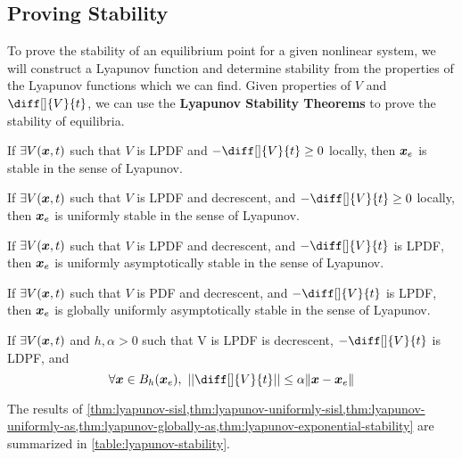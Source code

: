 \subsection{Proving Stability}
To prove the stability of an equilibrium point for a given nonlinear system, we
will construct a Lyapunov function and determine stability from the properties
of the Lyapunov functions which we can find. Given properties of $V$ and $\diff[]{V}{t}$, we can use the \textbf{Lyapunov
Stability Theorems} to prove the stability of equilibria.
\begin{theorem}
	If $\exists V(\boldsymbol{x}, t)$ such that $V$ is LPDF and
	$-\diff[]{V}{t} \geq 0$ locally, then $\boldsymbol{x}_e$ is stable in the sense of
	Lyapunov.
	\label{thm:lyapunov-sisl}
\end{theorem}
\begin{theorem}
	If $\exists V(\boldsymbol{x}, t)$ such that $V$ is LPDF and decrescent, and 
	$-\diff[]{V}{t} \geq 0$ locally, then $\boldsymbol{x}_e$ is uniformly stable in the sense of
	Lyapunov.
	\label{thm:lyapunov-uniformly-sisl}
\end{theorem}
\begin{theorem}
	If $\exists V(\boldsymbol{x}, t)$ such that $V$ is LPDF and decrescent, and 
	$-\diff[]{V}{t}$ is LPDF, then $\boldsymbol{x}_e$ is uniformly asymptotically stable in the sense of
	Lyapunov.
	\label{thm:lyapunov-uniformly-as}
\end{theorem}
\begin{theorem}
	If $\exists V(\boldsymbol{x}, t)$ such that $V$ is PDF and decrescent, and 
	$-\diff[]{V}{t}$ is LPDF, then $\boldsymbol{x}_e$ is globally uniformly asymptotically stable in the sense of
	Lyapunov.
	\label{thm:lyapunov-globally-as}
\end{theorem}
\begin{theorem}
	If $\exists V(\boldsymbol{x}, t)$ and $h, \alpha > 0$ such that V is LPDF is
	decrescent, $-\diff[]{V}{t}$ is LDPF, and \[
		\forall \bs{x}\in B_h(\bs{x}_e),\ \left\lvert\left\lvert\diff[]{V}{t}\right\rvert\right\rvert \leq \alpha \|\bs{x}-\bs{x}_e\|
	\]
	\label{thm:lyapunov-exponential-stability}
\end{theorem}
The results of
\cref{thm:lyapunov-sisl,thm:lyapunov-uniformly-sisl,thm:lyapunov-uniformly-as,thm:lyapunov-globally-as,thm:lyapunov-exponential-stability}
are summarized in \cref{table:lyapunov-stability}.
